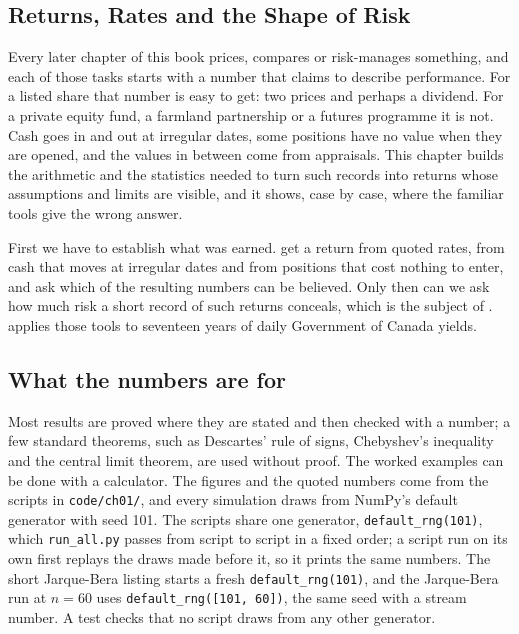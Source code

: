 
\begin{chapterrefs}
\chapter{Returns, Rates and the Shape of Risk}
\label{ch:returns}

Every later chapter of this book prices, compares or risk-manages something, and each of those tasks
starts with a number that claims to describe performance. For a listed share that number is easy to
get: two prices and perhaps a dividend. For a private equity fund, a farmland partnership or a futures
programme it is not. Cash goes in and out at irregular dates, some positions have no value when they
are opened, and the values in between come from appraisals. This chapter builds the
arithmetic and the statistics needed to turn such records into returns whose assumptions and limits
are visible, and it shows, case by case, where the familiar tools give the wrong answer.

First we have to establish what was earned.  get a return
from quoted rates, from cash that moves at irregular dates and from positions that cost nothing to
enter, and ask which of the resulting numbers can be believed. Only then can we ask how much risk a
short record of such returns conceals, which is the subject of .  applies those tools to seventeen years of daily Government of
Canada yields.

\section{What the numbers are for}
\label{sec:purpose}

\begin{keybox}
Most results are proved where they are stated and then checked with a number; a few standard
theorems, such as Descartes' rule of signs, Chebyshev's inequality and the central limit theorem, are
used without proof. The worked examples can be done with a calculator. The figures and the
quoted numbers come from the scripts in \texttt{code/ch01/}, and every simulation draws from NumPy's
default generator with seed 101. The scripts share one generator, \texttt{default\_rng(101)}, which
\texttt{run\_all.py} passes from script to script in a fixed order; a script run on its own first
replays the draws made before it, so it prints the same numbers. The short Jarque-Bera listing starts
a fresh \texttt{default\_rng(101)}, and the Jarque-Bera run at $n=60$ uses
\texttt{default\_rng([101, 60])}, the same seed with a stream number. A test checks that no script
draws from any other generator.
\end{keybox}


\end{chapterrefs}
